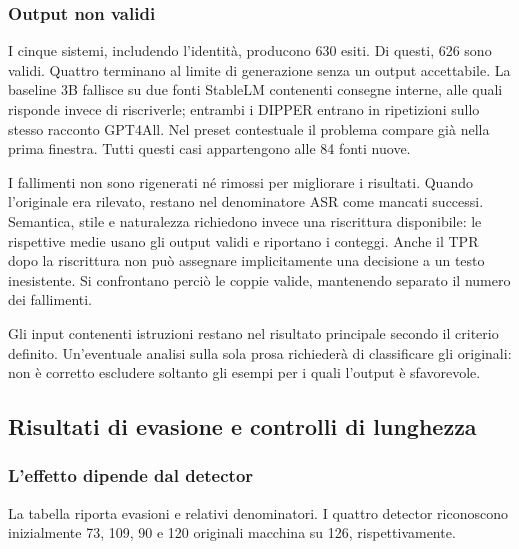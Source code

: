 \subsubsection{Output non validi}\label{output-non-validi}

I cinque sistemi, includendo l'identità, producono 630 esiti. Di questi, 626 sono validi. Quattro terminano al limite di generazione senza un output accettabile. La baseline 3B fallisce su due fonti StableLM contenenti consegne interne, alle quali risponde invece di riscriverle; entrambi i DIPPER entrano in ripetizioni sullo stesso racconto GPT4All. Nel preset contestuale il problema compare già nella prima finestra. Tutti questi casi appartengono alle 84 fonti nuove.

I fallimenti non sono rigenerati né rimossi per migliorare i risultati. Quando l'originale era rilevato, restano nel denominatore ASR come mancati successi. Semantica, stile e naturalezza richiedono invece una riscrittura disponibile: le rispettive medie usano gli output validi e riportano i conteggi. Anche il TPR dopo la riscrittura non può assegnare implicitamente una decisione a un testo inesistente. Si confrontano perciò le coppie valide, mantenendo separato il numero dei fallimenti.

Gli input contenenti istruzioni restano nel risultato principale secondo il criterio definito. Un'eventuale analisi sulla sola prosa richiederà di classificare gli originali: non è corretto escludere soltanto gli esempi per i quali l'output è sfavorevole.

\subsection{Risultati di evasione e controlli di lunghezza}\label{risultati-di-evasione-e-controlli-di-lunghezza}

\subsubsection{L'effetto dipende dal detector}\label{leffetto-dipende-dal-detector}

La tabella riporta evasioni e relativi denominatori. I quattro detector riconoscono inizialmente 73, 109, 90 e 120 originali macchina su 126, rispettivamente.

